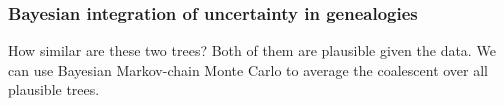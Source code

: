 \begin{frame}
\frametitle{Bayesian integration of uncertainty in genealogies}


\smallskip

How similar are these two trees? Both of them are plausible given the data.
We can use Bayesian Markov-chain Monte Carlo to average the coalescent over all plausible trees.
\end{frame}

